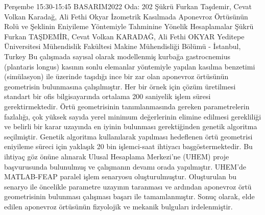 
    \begin{abstract_basarim}
    {Perşembe 15:30-15:45}
    {BASARIM2022}
    {Oda: 202}
    {Şükrü Furkan Taşdemir, Cevat Volkan Karadağ, Ali Fethi Okyar}
    {İzometrik Kasılmada Aponevroz Örtüsünün Rolü ve Şeklinin Eniyileme Yöntemiyle Tahminine Yönelik Hesaplamalar}
    {%
    Şükrü Furkan TAŞDEMİR, Cevat Volkan KARADAĞ, Ali Fethi OKYAR}
    {%
    }
    {%
    Yeditepe Üniversitesi Mühendislik Fakültesi Makine Mühendisliği Bölümü - İstanbul, Turkey}
    Bu çalışmada sayısal olarak modellenmiş kurbağa gastrocnemius (plantaris longus) kasının sonlu elemanlar yöntemiyle yapılan kasılma benzetimi (simülasyon) ile üzerinde taşıdığı ince bir zar olan aponevroz örtüsünün geometrisin bulunmasına çalışılmıştır. Her bir örnek için çözüm üretilmesi standart bir ofis bilgisayarında ortalama 200 saniyelik işlem süresi gerektirmektedir. Örtü geometrisinin tanımlanmasında gereken parametrelerin fazlalığı, çok yüksek sayıda yerel minimum değerlerinin elimine edilmesi gerekliliği ve belirli bir karar uzayında en iyinin bulunması gerektiğinden genetik algoritma seçilmiştir. Genetik algoritma kullanılarak yapılması hedeflenen örtü geometrisi eniyileme süreci için yaklaşık 20 bin işlemci-saat ihtiyacı başgöstermektedir. Bu ihtiyaç göz önüne alınarak Ulusal Hesaplama Merkezi’ne (UHEM) proje başvurusunda bulunulmuş ve çalışmanın devamı orada yapılmıştır. UHEM’de MATLAB-FEAP paralel işlem senaryosu oluşturulmuştur. Oluşturulan bu senaryo ile öncelikle parametre uzayının taranması ve ardından aponevroz örtü geometrisinin bulunması çalışması başarı ile tamamlanmıştır. Sonuç olarak, elde edilen aponevroz örtüsünün fizyolojik ve mekanik bulguları irdelenmiştir. 
    
    \end{abstract_basarim}
    